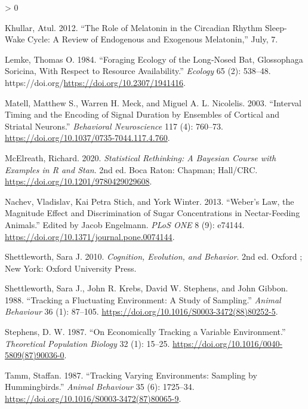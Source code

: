 \documentclass[
]{article}
\newlength{\cslhangindent}
\newenvironment{CSLReferences}[2] %
 {%
  \setlength{\parindent}{0pt}
  \ifodd #1 \everypar{\setlength{\hangindent}{\cslhangindent}}\ignorespaces\fi
  \ifnum #2 > 0
  \setlength{\parskip}{#2\baselineskip}
  \fi
 }%
 {}
\begin{document}
\begin{CSLReferences}{1}{0}
\leavevmode\hypertarget{ref-khullar_role_2012}{}%
Khullar, Atul. 2012. {``The Role of Melatonin in the Circadian Rhythm Sleep-Wake Cycle: A Review of Endogenous and Exogenous Melatonin,''} July, 7.

\leavevmode\hypertarget{ref-lemke_foraging_1984}{}%
Lemke, Thomas O. 1984. {``Foraging {Ecology} of the {Long}-{Nosed} {Bat}, {Glossophaga} {Soricina}, {With} {Respect} to {Resource} {Availability}.''} \emph{Ecology} 65 (2): 538--48. https://doi.org/\url{https://doi.org/10.2307/1941416}.

\leavevmode\hypertarget{ref-matell_interval_2003}{}%
Matell, Matthew S., Warren H. Meck, and Miguel A. L. Nicolelis. 2003. {``Interval Timing and the Encoding of Signal Duration by Ensembles of Cortical and Striatal Neurons.''} \emph{Behavioral Neuroscience} 117 (4): 760--73. \url{https://doi.org/10.1037/0735-7044.117.4.760}.

\leavevmode\hypertarget{ref-mcelreath_statistical_2020}{}%
McElreath, Richard. 2020. \emph{Statistical {Rethinking}: {A} {Bayesian} {Course} with {Examples} in {R} and {Stan}}. 2nd ed. Boca Raton: Chapman; Hall/CRC. \url{https://doi.org/10.1201/9780429029608}.

\leavevmode\hypertarget{ref-nachev_webers_2013}{}%
Nachev, Vladislav, Kai Petra Stich, and York Winter. 2013. {``Weber's {Law}, the {Magnitude} {Effect} and {Discrimination} of {Sugar} {Concentrations} in {Nectar}-{Feeding} {Animals}.''} Edited by Jacob Engelmann. \emph{PLoS ONE} 8 (9): e74144. \url{https://doi.org/10.1371/journal.pone.0074144}.

\leavevmode\hypertarget{ref-shettleworth_cognition_2010}{}%
Shettleworth, Sara J. 2010. \emph{Cognition, Evolution, and Behavior}. 2nd ed. Oxford ; New York: Oxford University Press.

\leavevmode\hypertarget{ref-shettleworth_tracking_1988}{}%
Shettleworth, Sara J., John R. Krebs, David W. Stephens, and John Gibbon. 1988. {``Tracking a Fluctuating Environment: A Study of Sampling.''} \emph{Animal Behaviour} 36 (1): 87--105. \url{https://doi.org/10.1016/S0003-3472(88)80252-5}.

\leavevmode\hypertarget{ref-stephens_economically_1987}{}%
Stephens, D. W. 1987. {``On Economically Tracking a Variable Environment.''} \emph{Theoretical Population Biology} 32 (1): 15--25. \url{https://doi.org/10.1016/0040-5809(87)90036-0}.

\leavevmode\hypertarget{ref-tamm_tracking_1987}{}%
Tamm, Staffan. 1987. {``Tracking Varying Environments: Sampling by Hummingbirds.''} \emph{Animal Behaviour} 35 (6): 1725--34. \url{https://doi.org/10.1016/S0003-3472(87)80065-9}.


\end{CSLReferences}
\end{document}
